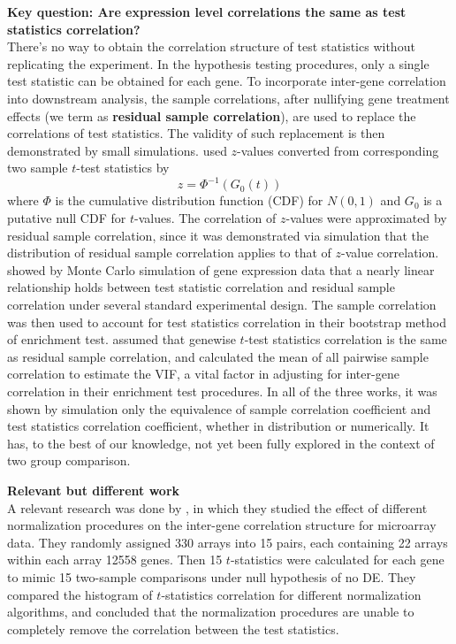 \documentclass[11pt, a4paper]{article}
\begin{document}
\textbf{Key question: Are  expression level correlations the same as test statistics correlation?}\\
There's no way to obtain the correlation structure of test statistics without replicating the experiment.  
In the hypothesis testing procedures, only a single test statistic can be obtained for each gene. To incorporate inter-gene correlation into downstream analysis,  the sample correlations, after nullifying gene treatment effects (we term as \textbf{residual sample correlation}), are used to replace the correlations of test statistics. The validity of such replacement is then demonstrated by small simulations. \cite{efron2007correlation} used $z$-values converted from corresponding two sample $t$-test statistics by 
\begin{equation}\label{t2z}
z  = \Phi^{-1}(G_0(t))
\end{equation}
where $\Phi$ is the cumulative distribution function (CDF) for $N(0, 1)$ and $G_0$ is a putative null CDF for $t$-values. The correlation of $z$-values were approximated by residual sample correlation, since it was demonstrated via simulation that the distribution of residual sample correlation applies to that of $z$-value correlation. \cite{barry2008statistical} showed by Monte Carlo simulation of gene expression data that a nearly linear relationship holds between test statistic correlation and residual sample correlation under several standard experimental design. The sample correlation was then used to account for test statistics correlation in their bootstrap method of enrichment test. \cite{wu2012camera} assumed that genewise $t$-test statistics correlation is the same as residual sample correlation, and calculated the mean of all pairwise sample correlation to estimate the VIF, a vital factor in adjusting for inter-gene correlation in their enrichment test procedures. In all of the three works, it was shown by simulation only the equivalence of sample correlation coefficient and test statistics correlation coefficient, whether in distribution or numerically. It has, to the best of our knowledge, not yet been fully explored in the context of two group comparison.

\textbf{Relevant but different work}\\
A relevant research was done by \cite{qiu2005effects}, in which they studied the effect of different normalization procedures on the inter-gene correlation structure for microarray data. They randomly assigned 330 arrays into 15 pairs, each containing 22 arrays within each array 12558 genes. Then 15 $t$-statistics were calculated for each gene to mimic 15 two-sample comparisons under null hypothesis of no DE. They compared the histogram of $t$-statistics correlation for different normalization algorithms, and concluded that the normalization procedures are unable to completely remove the correlation between the test statistics. %
\end{document}
